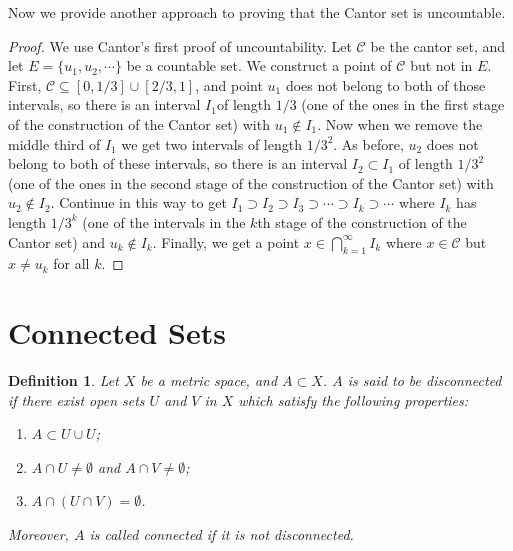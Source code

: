 \documentclass[10pt]{book}
\newtheorem{definition}{Definition}[chapter]
\theoremstyle{definition}
\numberwithin{equation}{chapter}
\begin{document}
\medskip

Now we provide another approach to proving that the Cantor set is uncountable.

\medskip

\begin{proof} We use Cantor's first proof of uncountability. Let $\mathcal{C}$ be the cantor set, and let $E = \{u_1,u_2,\cdots\}$ be a countable set. We construct a point of $\mathcal{C}$ but not in $E$. First, $\mathcal{C} \subseteq [0,1/3] \cup [2/3,1]$, and point $u_1$ does not belong to both of those intervals, so there is an interval $I_1$of length $1/3$ (one of the ones in the first stage of the construction of the Cantor set) with $u_1 \notin I_1$. Now when we remove the middle third of $I_1$ we get two intervals of length $1/3^2$. As before, $u_2$ does not belong to both of these intervals, so there is an interval $I_2 \subset I_1$ of length $1/3^2$ (one of the ones in the second stage of the construction of the Cantor set) with $u_2 \notin I_2$. Continue in this way to get $I_1 \supset I_2 \supset I_3 \supset \cdots \supset I_k \supset \cdots$ where $I_k$ has length $1/3^k$ (one of the intervals in the $k$th stage of the construction of the Cantor set) and $u_k \notin I_k$. Finally, we get a point $x \in \bigcap^\infty_{k=1} I_k$ where $x \in \mathcal{C}$ but $x \neq u_k$ for all $k$.
\end{proof}

\medskip



\section{Connected Sets}

\begin{definition}
Let $X$ be a metric space, and $A \subset X$. $A$ is said to be disconnected if there exist open sets $U$ and $V$ in $X$ which satisfy the following properties:
\begin{enumerate}[label=(\alph*)]
    \item $A \subset U \cup U$;
    
    \item $A \cap U \neq \emptyset$ and $A \cap V \neq \emptyset$;
    
    \item $A \cap (U \cap V) = \emptyset$.
\end{enumerate}
Moreover, $A$ is called connected if it is not disconnected.
\end{definition}
\end{document}
